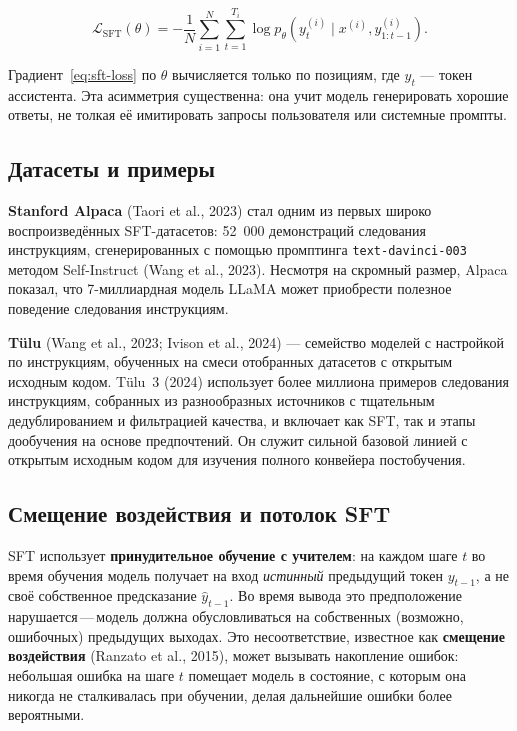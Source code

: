 \begin{equation}
\label{eq:sft-loss}
\mathcal{L}_{\mathrm{SFT}}(\theta) = -\frac{1}{N}\sum_{i=1}^{N}\sum_{t=1}^{T_i} \log p_\theta\!\left(y_t^{(i)} \mid x^{(i)}, y_{1:t-1}^{(i)}\right).
\end{equation}

Градиент~\eqref{eq:sft-loss} по $\theta$ вычисляется только по позициям, где $y_t$ --- токен ассистента. Эта асимметрия существенна: она учит модель генерировать хорошие ответы, не толкая её имитировать запросы пользователя или системные промпты.

\subsection{Датасеты и примеры}

\textbf{Stanford Alpaca} (Taori et al., 2023) стал одним из первых широко воспроизведённых SFT-датасетов: 52~000 демонстраций следования инструкциям, сгенерированных с помощью промптинга \texttt{text-davinci-003} методом Self-Instruct (Wang et al., 2023). Несмотря на скромный размер, Alpaca показал, что 7-миллиардная модель LLaMA может приобрести полезное поведение следования инструкциям.

\textbf{T\"{u}lu} (Wang et al., 2023; Ivison et al., 2024) --- семейство моделей с настройкой по инструкциям, обученных на смеси отобранных датасетов с открытым исходным кодом. T\"{u}lu~3 (2024) использует более миллиона примеров следования инструкциям, собранных из разнообразных источников с тщательным дедублированием и фильтрацией качества, и включает как SFT, так и этапы дообучения на основе предпочтений. Он служит сильной базовой линией с открытым исходным кодом для изучения полного конвейера постобучения.

\subsection{Смещение воздействия и потолок SFT}

SFT использует \textbf{принудительное обучение с учителем}: на каждом шаге $t$ во время обучения модель получает на вход \emph{истинный} предыдущий токен $y_{t-1}$, а не своё собственное предсказание $\hat{y}_{t-1}$. Во время вывода это предположение нарушается\,---\,модель должна обусловливаться на собственных (возможно, ошибочных) предыдущих выходах. Это несоответствие, известное как \textbf{смещение воздействия} (Ranzato et al., 2015), может вызывать накопление ошибок: небольшая ошибка на шаге $t$ помещает модель в состояние, с которым она никогда не сталкивалась при обучении, делая дальнейшие ошибки более вероятными.

